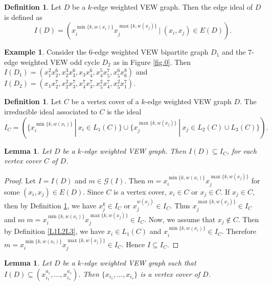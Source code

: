 \documentclass[11pt,reqno]{amsart}
\newtheorem{lemma}[theorem]{Lemma}
\theoremstyle{definition}
\newtheorem{definition}[theorem]{Definition}
\newtheorem{example}[theorem]{Example}
\begin{document}
\begin{definition}
	Let $D$ be a $k$-edge weighted VEW graph.	Then the edge ideal of $D$ is defined as
	$$I(D)  =  \left(x_i^{\min\{k,w(x_i)\}} x_j^{\max\{k,w(x_j)\}}~|~(x_i,x_j) \in E(D) \right)      .$$	
	
\end{definition}


\begin{example}
Consider the  $6$-edge weighted VEW bipartite graph $D_1$ and the $7$-edge weighted VEW odd cycle $D_2$  as in Figure \ref{fig.0}.  Then $I(D_1) =(x_1^2x_2^6,x_2^3x_{3}^6,x_3x_4^6,x_4^5x_5^7,x_5^6x_6^8)$ 
 and  $I(D_2) =(x_1x_2^7,x_2^2x_{3}^7,x_4^7x_3^7,x_5^2x_4^7,x_5^2x_1^7)$.
 \end{example}

\begin{definition}\label{def:irreducible}
	Let $ C $ be a vertex cover of a $k$-edge weighted VEW graph $ D $. The irreducible ideal associated to $ C $ is the
	ideal
$$I_C  =  \left( \{x_i^{\min\{k, w(x_i)\}}~|~x_i \in L_1(C)   \}    \cup    \{x_j^{\max\{k, w(x_j)\}}~|~x_j \in  L_2(C) \cup L_3(C) \} \right).$$
\end{definition}




\begin{lemma}\label{edge}
	Let $ D $ be a $k$-edge weighted VEW graph. Then $ I(D) \subseteq  I_C $, for each vertex cover $ C $ of $ D $.
\end{lemma}

\begin{proof}
	Let $ I = I(D) $ and $ m \in \mathcal{G}(I) $. Then $ m = x_i^{\min\{k,w(x_i)\}} x_j^{\max\{k,w(x_j)\}}$ for some $(x_i,x_j) \in E(D) $. Since
	$ C $ is a vertex cover, $ x_i \in C $ or $ x_j \in C $.
	If $ x_j \in C $, then by Definition \ref{def:irreducible}, we have $ x_j^{k} \in I_C $ or $ x_j^{w(x_j)} \in I_C $. Thus
	$  x_j^{\max\{k,w(x_j)\}} \in I_C$ and so
	$ m = x_i^{\min\{k,w(x_i)\}} x_j^{\max\{k,w(x_j)\}} \in I_C$.
	Now, we assume that $x_j \notin C$. Then by Definition \ref{L1L2L3}, we have $x_i \in L_1(C) $ and
	$  x_i^{\min\{k,w(x_i)\}} \in I_C$.
Therefore
	$ m = x_i^{\min\{k,w(x_i)\}} x_j^{\max\{k,w(x_j)\}} \in I_C$.  Hence $I \subseteq I_C$.    
\end{proof}	


\begin{lemma}\label{v.c}
	Let $ D $ be  a $k$-edge weighted VEW  graph  such  that $  I(D) \subseteq (x_{i_1}^{a_1},\ldots,x_{i_s}^{a_s}).$ Then $ \{{x_{i_1}},\ldots,{x_{i_s}}\} $ is a vertex cover of $ D $.   	
\end{lemma}
\end{document}
